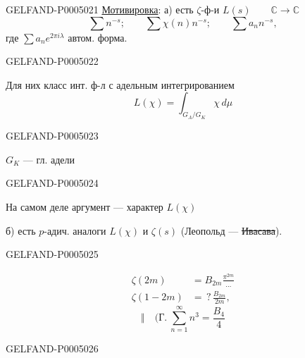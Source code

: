 \begin{GelfandAdjacentEvidence}{GELFAND-P000502}{1}
\uline{Мотивировка}: а) есть $\zeta$-ф-и
$L(s)\qquad \mathbb C\longrightarrow\mathbb C$
\[
\sum n^{-s};\qquad \sum\chi(n)n^{-s};\qquad \sum a_n n^{-s},
\]
где $\sum a_n e^{2\pi i\lambda}$ автом. форма.
\end{GelfandAdjacentEvidence}
\begin{GelfandAdjacentEvidence}{GELFAND-P000502}{2}


Для них класс инт. ф-л с адельным интегрированием
\[
L(\chi)=\int_{G_A/G_K}\chi\,d\mu
\]
\end{GelfandAdjacentEvidence}
\begin{GelfandAdjacentEvidence}{GELFAND-P000502}{3}

\begin{flushright}
$G_K$ — гл. адели
\end{flushright}
\end{GelfandAdjacentEvidence}
\begin{GelfandAdjacentEvidence}{GELFAND-P000502}{4}


На самом деле аргумент — характер $L(\chi)$

б) есть $p$-адич. аналоги $L(\chi)$ и $\zeta(s)$
(Леопольд — \sout{Ивасава}).
\end{GelfandAdjacentEvidence}
\begin{GelfandAdjacentEvidence}{GELFAND-P000502}{5}

\begin{align*}
\zeta(2m)&=B_{2m}\frac{\pi^{2m}}{\ldots}\\
\zeta(1-2m)&=\,?\,\frac{B_{2m}}{2m},
\end{align*}
\[
\Vert\quad \biggl(\text{Г.}\ \sum_{n=1}^{\infty}n^3=\frac{B_4}{4}
\]
\end{GelfandAdjacentEvidence}
\begin{GelfandAdjacentEvidence}{GELFAND-P000502}{6}

\end{GelfandAdjacentEvidence}
